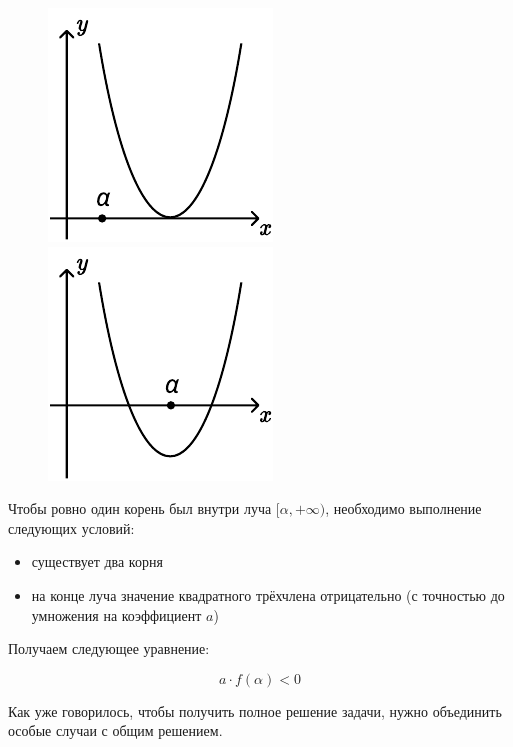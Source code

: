 \begin {figure}[h]
    \begin {minipage} [t] {0.5\linewidth}
        \centering
        \includegraphics [width=0.6\linewidth] {image/image_20.pdf}
    \end {minipage}
    \hfill
    \begin {minipage} [t] {0.5\linewidth}
        \centering
        \includegraphics [width=0.6\linewidth] {image/image_21.pdf}
    \end {minipage}
\end {figure}

Чтобы ровно один корень был внутри луча $[\alpha, +\infty)$, необходимо выполнение следующих
условий:

\begin {itemize}
    \item {существует два корня}
    \item {на конце луча значение квадратного трёхчлена отрицательно (с точностью до умножения на 
           коэффициент $a$)}
\end {itemize}

Получаем следующее уравнение:

\begin {equation*}
    a \cdot f(\alpha) < 0
\end {equation*}

Как уже говорилось, чтобы получить полное решение задачи, нужно объединить особые случаи с общим 
решением.
